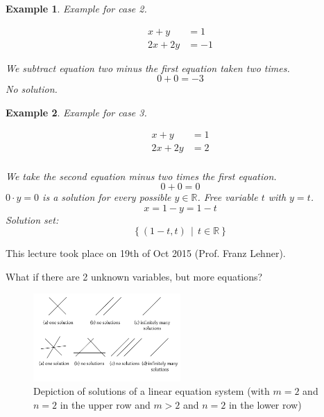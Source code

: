 \documentclass[a4paper,landscape,twocolumn]{article}
\newcommand\meta[3]{This #1 took place on #2 (#3).\par}
\newcommand\setdef[2]{\left\{#1\,\middle|\,#2\right\}}
\newtheorem{ex}{Example}
\begin{document}
\begin{ex}
  Example for case 2.

  \begin{align*}
     x +  y &= 1 \\
    2x + 2y &= -1
  \end{align*}

  We subtract equation two minus the first equation taken two times.
  \[ 0 + 0 = -3 \]
  No solution.
\end{ex}

\begin{ex}
  Example for case 3.

  \begin{align*}
    x + y &= 1 \\
    2x + 2y &= 2 \\
  \end{align*}

  We take the second equation minus two times the first equation.
  \[ 0 + 0 = 0 \]
  $0 \cdot y = 0$ is a solution for every possible $y \in \mathbb{R}$.
  Free variable $t$ with $y = t$.
  \[ x = 1 - y = 1 - t \]
  Solution set:
  \[ \setdef{(1 - t, t)}{t \in \mathbb{R}} \]
\end{ex}

\meta{lecture}{19th of Oct 2015}{Prof. Franz Lehner}

What if there are 2 unknown variables, but more equations?

\begin{figure}[t]
  \begin{center}
    \includegraphics[width=0.5\textwidth]{img/linear_equation_visualization.pdf}
    \caption{
      Depiction of solutions of a linear equation system
      (with $m=2$ and $n=2$ in the upper row and $m>2$ and $n=2$ in the lower row)
    }
    \label{img:lineqsys-solutions}
  \end{center}
\end{figure}
\end{document}
